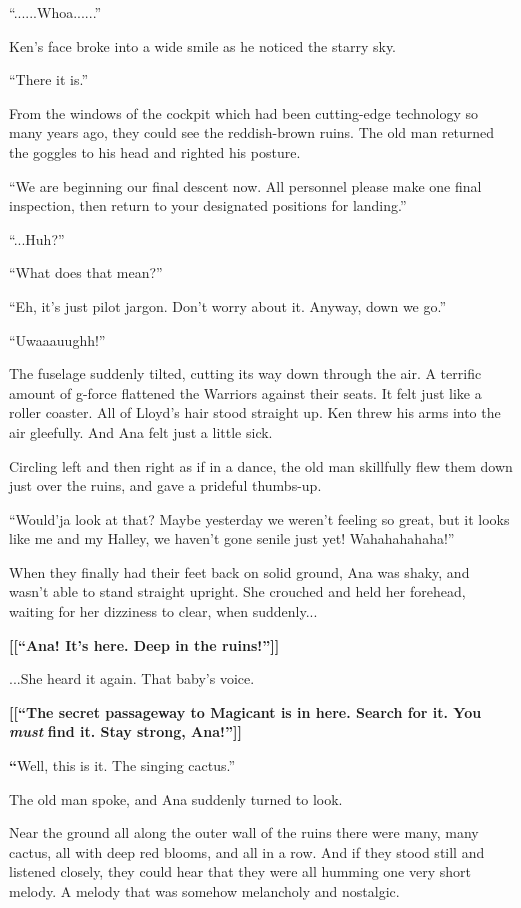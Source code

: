 \documentclass[
]{article}
\begin{document}
``......Whoa......''

Ken's face broke into a wide smile as he noticed the starry sky.

``There it is.''

From the windows of the cockpit which had been cutting-edge technology
so many years ago, they could see the reddish-brown ruins. The old man
returned the goggles to his head and righted his posture.

``We are beginning our final descent now. All personnel please make one
final inspection, then return to your designated positions for
landing.''

``...Huh?''

``What does that mean?''

``Eh, it's just pilot jargon. Don't worry about it. Anyway, down we
go.''

``Uwaaauughh!''

The fuselage suddenly tilted, cutting its way down through the air. A
terrific amount of g-force flattened the Warriors against their seats.
It felt just like a roller coaster. All of Lloyd's hair stood straight
up. Ken threw his arms into the air gleefully. And Ana felt just a
little sick.

Circling left and then right as if in a dance, the old man skillfully
flew them down just over the ruins, and gave a prideful thumbs-up.

``Would'ja look at that? Maybe yesterday we weren't feeling so great,
but it looks like me and my Halley, we haven't gone senile just yet!
Wahahahahaha!''

When they finally had their feet back on solid ground, Ana was shaky,
and wasn't able to stand straight upright. She crouched and held her
forehead, waiting for her dizziness to clear, when suddenly...

\textbf{{[}{[}``Ana! It's here. Deep in the ruins!''{]}{]}}

\textbf{}...She heard it again. That baby's voice.

\textbf{{[}{[}``The secret passageway to Magicant is in here. Search for
it. You }\emph{\textbf{must}}\textbf{ find it. Stay strong,
Ana!''{]}{]}}

\textbf{``}Well, this is it. The singing cactus.''

The old man spoke, and Ana suddenly turned to look.

Near the ground all along the outer wall of the ruins there were many,
many cactus, all with deep red blooms, and all in a row. And if they
stood still and listened closely, they could hear that they were all
humming one very short melody. A melody that was somehow melancholy and
nostalgic.
\end{document}
